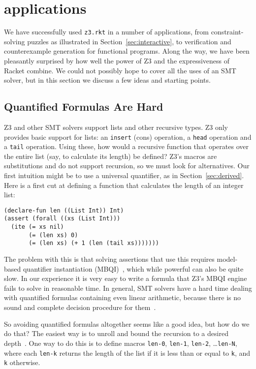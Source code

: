 \section{applications}

We have successfully used \texttt{z3.rkt} in a number of applications, from
constraint-solving puzzles as illustrated in Section~\ref{sec:interactive}, to
verification and counterexample generation for functional programs. Along the
way, we have been pleasantly surprised by how well the power of Z3 and the
expressiveness of Racket combine. We could not possibly hope to cover all the
uses of an SMT solver, but in this section we discuss a few ideas and starting
points.

\subsection{Quantified Formulas Are Hard}
\label{sec:quantified}

Z3 and other SMT solvers support lists and other recursive types. Z3 only
provides basic support for lists: an \texttt{insert} (cons) operation, a
\texttt{head} operation and a \texttt{tail} operation. Using these, how would
a recursive function that operates over the entire list (say, to calculate its
length) be defined? Z3's macros are substitutions and do not support
recursion, so we must look for alternatives. Our first intuition might be to
use a universal quantifier, as in Section~\ref{sec:derived}. Here is a first
cut at defining a function that calculates the length of an integer list:

\begin{verbatim}
(declare-fun len ((List Int)) Int)
(assert (forall ((xs (List Int)))
  (ite (= xs nil)
       (= (len xs) 0)
       (= (len xs) (+ 1 (len (tail xs)))))))
\end{verbatim}

The problem with this is that solving assertions that use this requires model-
based quantifier instantiation (MBQI)~\cite{mbqi}, which while powerful can
also be quite slow. In our experience it is very easy to write a formula that
Z3's MBQI engine fails to solve in reasonable time. In general, SMT solvers
have a hard time dealing with quantified formulas containing even linear
arithmetic, because there is no sound and complete decision procedure for
them~\cite{halpern91}.

So avoiding quantified formulas altogether seems like a good idea, but how do
we do that? The easiest way is to unroll and bound the recursion to a desired
depth~\cite{sat-recursive}. One way to do this is to define macros
\texttt{len-0}, \texttt{len-1}, \texttt{len-2}, \ldots \texttt{len-N}, where
each \texttt{len-k} returns the length of the list if it is less than or equal
to \texttt{k}, and \texttt{k} otherwise.

